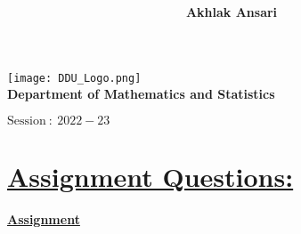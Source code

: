 \documentclass[a4paper,12pt]{article}
\title{\underline {\sc {\textbf ASSIGNMENT: BANACH SPACES}}}
\author{\textbf{Akhlak Ansari}}
\begin{document}
    \pgfplotsset{compat=1.17}
    \color{black}

    \maketitle 

         
    
    \begin{center}
      
        \texttt{[image: DDU\_Logo.png]}\\[3mm]
        \textbf{ {\LARGE Department of Mathematics and Statistics}}
    \end{center}



    \vspace*{7cm}


    \begin{center}
        \textbf{$\mbox{Session}\ :\ 2022-23$ }
    \end{center}

    \section*{\LARGE{\underline{\bf {Assignment Questions:}}}}

    \begin{center}
        \LARGE{{\underline{\bf Assignment }}}
    \end{center}
\end{document}

